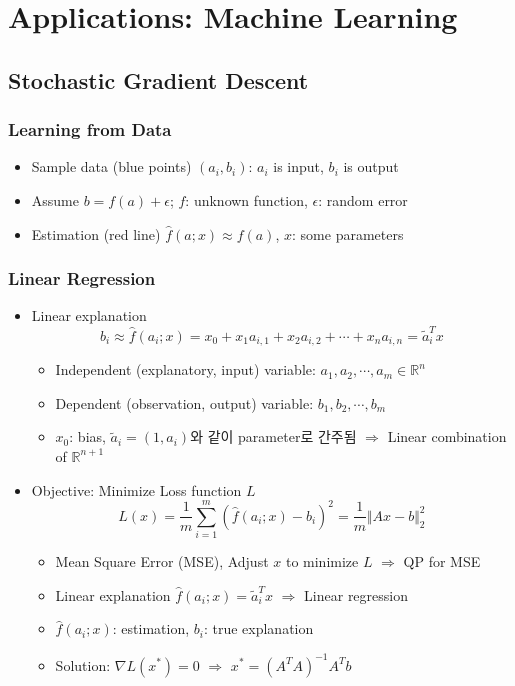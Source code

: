 \section{Applications: Machine Learning}

\subsection{Stochastic Gradient Descent}

\subsubsection*{Learning from Data}
\begin{itemize}
    \item Sample data (blue points) $(a_i, b_i)$: $a_i$ is input, $b_i$ is output
    \item Assume $b=f(a)+\epsilon$; $f$: unknown function, $\epsilon$: random error
    \item Estimation (red line) $\hat{f}(a;x)\approx f(a)$, $x$: some parameters
\end{itemize}
\begin{figures}
\end{figures}

\subsubsection*{Linear Regression}
\begin{itemize}
    \item Linear explanation
        $$ b_i\approx\hat{f}(a_i;x)=x_0+x_1a_{i,1}+x_2a_{i,2}+\cdots+x_na_{i,n}=\tilde{a}_i^Tx $$
    \begin{itemize}
        \item Independent (explanatory, input) variable: $a_1,a_2,\cdots,a_m\in\mathbb{R}^n$
        \item Dependent (observation, output) variable: $b_1,b_2,\cdots,b_m$
        \item $x_0$: bias, $\tilde{a}_i=(1,a_i)$와 같이 parameter로 간주됨 $\Rightarrow$ Linear combination of $\mathbb{R}^{n+1}$
    \end{itemize}
    \item Objective: Minimize Loss function $L$
        $$ L(x)=\frac{1}{m}\sum_{i=1}^{m}\left(\hat{f}(a_i;x)-b_i\right)^2 = \frac{1}{m}\Vert Ax-b\Vert_2^2 $$
    \begin{itemize}
        \item Mean Square Error (MSE), Adjust $x$ to minimize $L$ $\Rightarrow$ QP for MSE
        \item Linear explanation $\hat{f}(a_i;x)=\tilde{a}_i^Tx$ $\Rightarrow$ Linear regression
        \item $\hat{f}(a_i;x)$: estimation, $b_i$: true explanation
        \item Solution: $\nabla L(x^\ast)=0$ $\Rightarrow$ $x^\ast=(A^TA)^{-1}A^Tb$
    \end{itemize}
\end{itemize}

